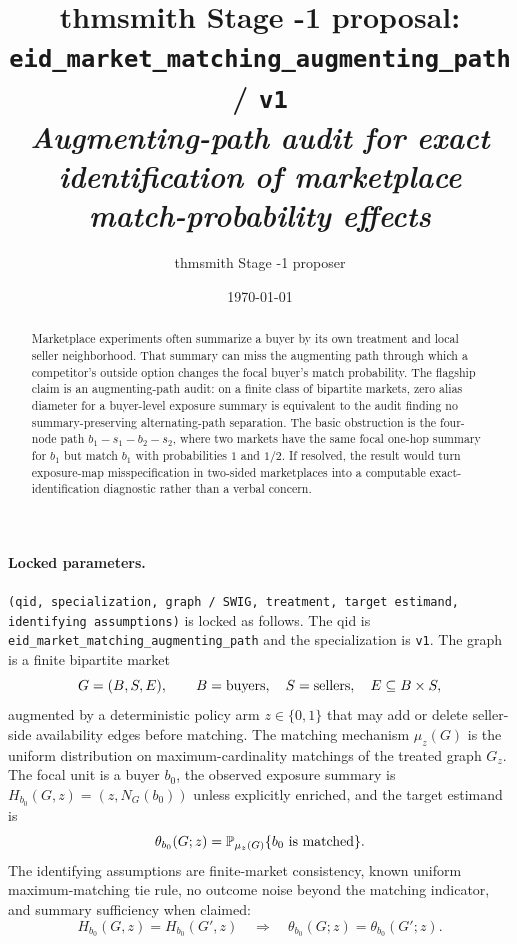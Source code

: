 \documentclass[11pt]{article}
\title{thmsmith Stage -1 proposal: \texttt{eid\_market\_matching\_augmenting\_path} / \texttt{v1}%
  \\ \large\textit{Augmenting-path audit for exact identification of marketplace match-probability effects}}
\author{thmsmith Stage -1 proposer}
\date{\today}
\renewcommand{\Pr}{\mathbb{P}}
\theoremstyle{definition}
\theoremstyle{plain}
\theoremstyle{remark}
\begin{document}
\maketitle


\paragraph{Locked parameters.}
\texttt{(qid, specialization, graph / SWIG, treatment, target estimand, identifying assumptions)}
is locked as follows.  The qid is \texttt{eid\_market\_matching\_augmenting\_path} and the specialization is \texttt{v1}.  The graph is a finite bipartite market
\[
G=(B,S,E), \qquad B=\hbox{buyers},\quad S=\hbox{sellers},\quad E\subseteq B\times S,
\]
augmented by a deterministic policy arm \(z\in\{0,1\}\) that may add or delete seller-side availability edges before matching.  The matching mechanism \(\mu_z(G)\) is the uniform distribution on maximum-cardinality matchings of the treated graph \(G_z\).  The focal unit is a buyer \(b_0\), the observed exposure summary is \(H_{b_0}(G,z)=(z,N_G(b_0))\) unless explicitly enriched, and the target estimand is
\[
\theta_{b_0}(G;z)=\Pr_{\mu_z(G)}\{b_0\hbox{ is matched}\}.
\]
The identifying assumptions are finite-market consistency, known uniform maximum-matching tie rule, no outcome noise beyond the matching indicator, and summary sufficiency when claimed:
\[
H_{b_0}(G,z)=H_{b_0}(G',z) \quad\Longrightarrow\quad
\theta_{b_0}(G;z)=\theta_{b_0}(G';z).
\]

\begin{abstract}
Marketplace experiments often summarize a buyer by its own treatment and local seller neighborhood.  That summary can miss the augmenting path through which a competitor's outside option changes the focal buyer's match probability.  The flagship claim is an augmenting-path audit: on a finite class of bipartite markets, zero alias diameter for a buyer-level exposure summary is equivalent to the audit finding no summary-preserving alternating-path separation.  The basic obstruction is the four-node path \(b_1-s_1-b_2-s_2\), where two markets have the same focal one-hop summary for \(b_1\) but match \(b_1\) with probabilities \(1\) and \(1/2\).  If resolved, the result would turn exposure-map misspecification in two-sided marketplaces into a computable exact-identification diagnostic rather than a verbal concern.
\end{abstract}
\end{document}
